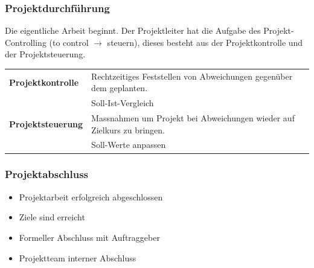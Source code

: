 \subsubsection{Projektdurchführung}
Die eigentliche Arbeit beginnt. Der Projektleiter hat die Aufgabe des Projekt-Controlling (to control $\rightarrow$ steuern), dieses besteht aus der Projektkontrolle und der Projektsteuerung. 
\renewcommand{\arraystretch}{1.2}
\begin{table}[h!]
	\begin{tabular}{|l|l|}
		\hline \textbf{Projektkontrolle} 	& Rechtzeitiges Feststellen von Abweichungen gegenüber dem geplanten.  \\ 
		& Soll-Ist-Vergleich\\
		\hline  \textbf{Projektsteuerung} 	& Massnahmen um Projekt bei Abweichungen wieder auf Zielkurs zu bringen. \\
		& Soll-Werte anpassen\\
		\hline
	\end{tabular}
\end{table}
\subsubsection{Projektabschluss}
\begin{itemize}
	\item Projektarbeit erfolgreich abgeschlossen
	\item Ziele sind erreicht
	\item Formeller Abschluss mit Auftraggeber
	\item Projektteam interner Abschluss
\end{itemize}